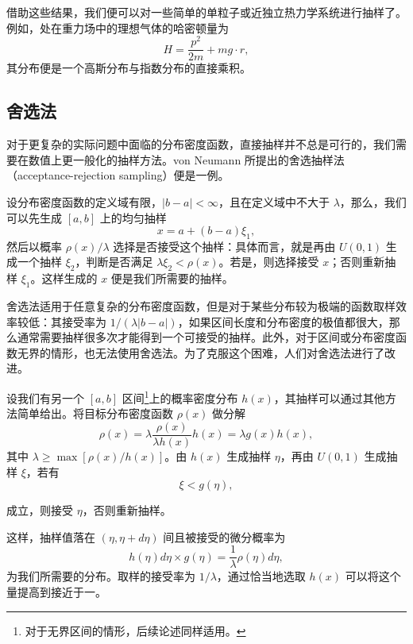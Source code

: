 借助这些结果，我们便可以对一些简单的单粒子或近独立热力学系统进行抽样了。例如，处在重力场中的理想气体的哈密顿量为
\[
 H=\frac{p^2}{2m}+mg\cdot r,
\]
其分布便是一个高斯分布与指数分布的直接乘积。

\subsection{舍选法}

对于更复杂的实际问题中面临的分布密度函数，直接抽样并不总是可行的，我们需要在数值上更一般化的抽样方法。von Neumann 所提出的舍选抽样法（acceptance-rejection sampling）便是一例。

设分布密度函数的定义域有限，$|b-a|<\infty$，且在定义域中不大于 $\lambda$，那么，我们可以先生成 $[a,b]$ 上的均匀抽样
\begin{equation}
 x=a+(b-a)\xi_1,
\tag{7.1.24}
\end{equation}
然后以概率 $\rho(x)/\lambda$ 选择是否接受这个抽样：具体而言，就是再由 $U(0,1)$ 生成一个抽样 $\xi_2$，判断是否满足 $\lambda\xi_2<\rho(x)$。若是，则选择接受 $x$；否则重新抽样 $\xi_1$。这样生成的 $x$ 便是我们所需要的抽样。

舍选法适用于任意复杂的分布密度函数，但是对于某些分布较为极端的函数取样效率较低：其接受率为 $1/(\lambda|b-a|)$，如果区间长度和分布密度的极值都很大，那么通常需要抽样很多次才能得到一个可接受的抽样。此外，对于区间或分布密度函数无界的情形，也无法使用舍选法。为了克服这个困难，人们对舍选法进行了改进。

设我们有另一个 $[a,b]$ 区间\footnote{对于无界区间的情形，后续论述同样适用。}上的概率密度分布 $h(x)$，其抽样可以通过其他方法简单给出。将目标分布密度函数 $\rho(x)$ 做分解
\begin{equation}
 \rho(x)=\lambda\frac{\rho(x)}{\lambda h(x)}h(x)=\lambda g(x)h(x),
\tag{7.1.25}
\end{equation}
其中 $\lambda\ge\max[\rho(x)/h(x)]$。由 $h(x)$ 生成抽样 $\eta$，再由 $U(0,1)$ 生成抽样 $\xi$，若有
\begin{equation}
 \xi<g(\eta),
\tag{7.1.26}
\end{equation}

成立，则接受 $\eta$，否则重新抽样。

这样，抽样值落在 $(\eta,\eta+d\eta)$ 间且被接受的微分概率为
\begin{equation}
 h(\eta)d\eta\times g(\eta)=\frac1\lambda\rho(\eta)d\eta,
\tag{7.1.27}
\end{equation}
为我们所需要的分布。取样的接受率为 $1/\lambda$，通过恰当地选取 $h(x)$ 可以将这个量提高到接近于一。

